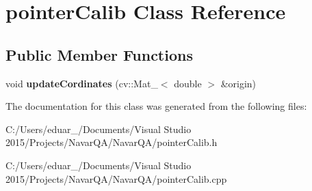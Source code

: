 \hypertarget{classpointer_calib}{}\section{pointer\+Calib Class Reference}
\label{classpointer_calib}
\subsection*{Public Member Functions}
\begin{DoxyCompactItemize}
\item 
void {\bfseries update\+Cordinates} (cv\+::\+Mat\+\_\+$<$ double $>$ \&origin)\hypertarget{classpointer_calib_a3146722337ba0faab6d61ddb4f662aa6}{}\label{classpointer_calib_a3146722337ba0faab6d61ddb4f662aa6}

\end{DoxyCompactItemize}


The documentation for this class was generated from the following files\+:\begin{DoxyCompactItemize}
\item 
C\+:/\+Users/eduar\+\_/\+Documents/\+Visual Studio 2015/\+Projects/\+Navar\+Q\+A/\+Navar\+Q\+A/pointer\+Calib.\+h\item 
C\+:/\+Users/eduar\+\_/\+Documents/\+Visual Studio 2015/\+Projects/\+Navar\+Q\+A/\+Navar\+Q\+A/pointer\+Calib.\+cpp\end{DoxyCompactItemize}
